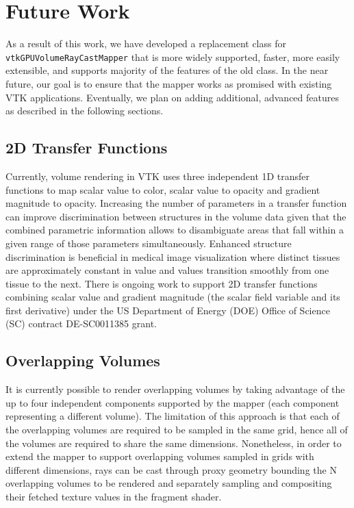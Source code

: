 \section{Future Work}
\label{future-work}

As a result of this work, we have developed a replacement class for
\texttt{vtkGPUVolumeRayCastMapper} that is more widely supported, faster, more
easily extensible, and supports majority of the features of the old class. In
the near future, our goal is to ensure that the mapper works as promised with
existing VTK applications. Eventually, we plan on adding additional, advanced
features as described in the following sections.

\subsection{2D Transfer Functions}
\label{2d-transfer-functions}
Currently, volume rendering in VTK uses three independent 1D transfer functions
to map scalar value to color, scalar value to opacity and gradient magnitude to
opacity. Increasing the number of parameters in a transfer function can improve
discrimination between structures in the volume data given that the combined
parametric information allows to disambiguate areas that fall within a given
range of those parameters simultaneously. Enhanced structure discrimination is
beneficial in medical image visualization where distinct tissues are
approximately constant in value and values transition smoothly from one tissue
to the next. There is ongoing work to support 2D transfer functions combining
scalar value and gradient magnitude (the scalar field variable and its first
derivative) under the US Department of Energy (DOE) Office of Science (SC)
contract DE-SC0011385 grant.

\subsection{Overlapping Volumes}
\label{overlapping-volumes}
It is currently possible to render overlapping volumes by taking advantage of
the up to four independent components supported by the mapper (each component
representing a different volume).
The limitation of this approach is that each of the overlapping volumes are
required to be sampled in the same grid, hence all of the volumes are required
to share the same dimensions.  Nonetheless, in order to extend the mapper to
support overlapping volumes sampled in grids with different dimensions, rays
can be cast through proxy geometry bounding the N overlapping volumes to be
rendered and separately sampling and compositing their fetched texture values in
the fragment shader.

